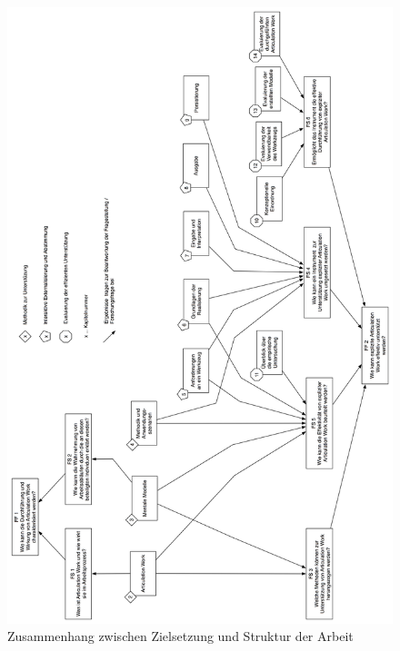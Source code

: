 \begin{figure}[htbp]
	\centering
		\includegraphics[height=.9\textheight]{img/Einfuehrung/zusammenhang.png}
	\caption{Zusammenhang zwischen Zielsetzung und Struktur der Arbeit }
	\label{fig:img_Einfuehrung_zusammenhang}
\end{figure}


